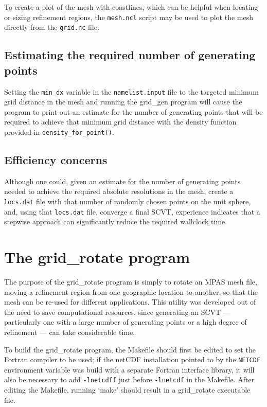To create a plot of the mesh with coastlines, which can be helpful when locating or sizing refinement regions, the {\tt mesh.ncl} script may be used to plot the mesh directly from                 
the {\tt grid.nc} file.                                                                          

\subsection{Estimating the required number of generating points}
\label{sec:estimating_np}

Setting the {\tt min\_dx} variable in the {\tt namelist.input} file to the targeted minimum grid distance in the mesh and running the grid\_gen program will cause the program to print out an estimate for the number of generating points that will be required to achieve that minimum grid distance with the density function provided in {\tt density\_for\_point()}.

\subsection{Efficiency concerns}
\label{sec:grid_gen_efficiency}

Although one could, given an estimate for the number of generating points needed to achieve the required absolute resolutions in the mesh,
create a {\tt locs.dat} file with that number of randomly chosen points on the unit sphere, and, using that {\tt locs.dat} file, converge a final SCVT, 
experience indicates that a stepwise approach can significantly reduce the required wallclock time.                   

   
\section{The grid\_rotate program} 
\label{sec:grid_rotate} 

The purpose of the grid\_rotate program is simply to rotate an MPAS mesh file, moving a refinement region from one geographic location to another, so that the mesh can be re-used for different applications. This utility was developed out of the need to save computational resources, since generating an SCVT --- particularly one with a large number of generating points or a high degree of refinement --- can take considerable time.

To build the grid\_rotate program, the Makefile should first be edited to set the Fortran compiler to be used; if the netCDF installation pointed to by the {\tt NETCDF} environment variable was build with a separate Fortran interface library, it will also be necessary to add {\tt -lnetcdff} just before {\tt -lnetcdf} in the Makefile. After editing the Makefile, running `make' should result in a grid\_rotate executable file.

